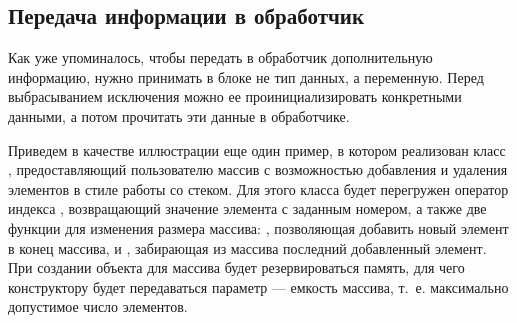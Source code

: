 \subsection[Передача информации в обработчик]{Передача информации в обработчик}\label{ch10:4.2}
Как уже упоминалось, чтобы  передать в обработчик дополнительную информацию, нужно
принимать в блоке  не тип данных, а переменную. Перед выбрасыванием исключения можно ее
проинициализировать конкретными данными, а потом прочитать эти данные в обработчике. 

Приведем в качестве иллюстрации еще один пример, в котором реализован класс , предоставляющий
пользователю массив с возможностью добавления и удаления элементов в стиле работы со стеком. Для этого класса будет
перегружен оператор индекса \Sys{[]}, возвращающий значение элемента с заданным номером, а также две
функции для изменения размера массива: , позволяющая добавить новый элемент в конец
массива, и , забирающая из массива последний добавленный элемент. При создании объекта для
массива будет резервироваться память, для чего конструктору будет передаваться параметр  
--- емкость массива, т.~е. максимально допустимое число элементов. 
